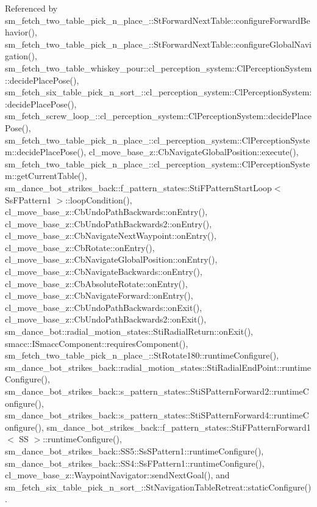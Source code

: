 Referenced by sm\+\_\+fetch\+\_\+two\+\_\+table\+\_\+pick\+\_\+n\+\_\+place\+\_\+::\+St\+Forward\+Next\+Table\+::configure\+Forward\+Behavior(), sm\+\_\+fetch\+\_\+two\+\_\+table\+\_\+pick\+\_\+n\+\_\+place\+\_\+::\+St\+Forward\+Next\+Table\+::configure\+Global\+Navigation(), sm\+\_\+fetch\+\_\+two\+\_\+table\+\_\+whiskey\+\_\+pour\+::cl\+\_\+perception\+\_\+system\+::\+Cl\+Perception\+System\+::decide\+Place\+Pose(), sm\+\_\+fetch\+\_\+six\+\_\+table\+\_\+pick\+\_\+n\+\_\+sort\+\_\+::cl\+\_\+perception\+\_\+system\+::\+Cl\+Perception\+System\+::decide\+Place\+Pose(), sm\+\_\+fetch\+\_\+screw\+\_\+loop\+\_\+::cl\+\_\+perception\+\_\+system\+::\+Cl\+Perception\+System\+::decide\+Place\+Pose(), sm\+\_\+fetch\+\_\+two\+\_\+table\+\_\+pick\+\_\+n\+\_\+place\+\_\+::cl\+\_\+perception\+\_\+system\+::\+Cl\+Perception\+System\+::decide\+Place\+Pose(), cl\+\_\+move\+\_\+base\+\_\+z\+::\+Cb\+Navigate\+Global\+Position\+::execute(), sm\+\_\+fetch\+\_\+two\+\_\+table\+\_\+pick\+\_\+n\+\_\+place\+\_\+::cl\+\_\+perception\+\_\+system\+::\+Cl\+Perception\+System\+::get\+Current\+Table(), sm\+\_\+dance\+\_\+bot\+\_\+strikes\+\_\+back\+::f\+\_\+pattern\+\_\+states\+::\+Sti\+F\+Pattern\+Start\+Loop$<$ Ss\+F\+Pattern1 $>$\+::loop\+Condition(), cl\+\_\+move\+\_\+base\+\_\+z\+::\+Cb\+Undo\+Path\+Backwards\+::on\+Entry(), cl\+\_\+move\+\_\+base\+\_\+z\+::\+Cb\+Undo\+Path\+Backwards2\+::on\+Entry(), cl\+\_\+move\+\_\+base\+\_\+z\+::\+Cb\+Navigate\+Next\+Waypoint\+::on\+Entry(), cl\+\_\+move\+\_\+base\+\_\+z\+::\+Cb\+Rotate\+::on\+Entry(), cl\+\_\+move\+\_\+base\+\_\+z\+::\+Cb\+Navigate\+Global\+Position\+::on\+Entry(), cl\+\_\+move\+\_\+base\+\_\+z\+::\+Cb\+Navigate\+Backwards\+::on\+Entry(), cl\+\_\+move\+\_\+base\+\_\+z\+::\+Cb\+Absolute\+Rotate\+::on\+Entry(), cl\+\_\+move\+\_\+base\+\_\+z\+::\+Cb\+Navigate\+Forward\+::on\+Entry(), cl\+\_\+move\+\_\+base\+\_\+z\+::\+Cb\+Undo\+Path\+Backwards\+::on\+Exit(), cl\+\_\+move\+\_\+base\+\_\+z\+::\+Cb\+Undo\+Path\+Backwards2\+::on\+Exit(), sm\+\_\+dance\+\_\+bot\+::radial\+\_\+motion\+\_\+states\+::\+Sti\+Radial\+Return\+::on\+Exit(), smacc\+::\+I\+Smacc\+Component\+::requires\+Component(), sm\+\_\+fetch\+\_\+two\+\_\+table\+\_\+pick\+\_\+n\+\_\+place\+\_\+::\+St\+Rotate180\+::runtime\+Configure(), sm\+\_\+dance\+\_\+bot\+\_\+strikes\+\_\+back\+::radial\+\_\+motion\+\_\+states\+::\+Sti\+Radial\+End\+Point\+::runtime\+Configure(), sm\+\_\+dance\+\_\+bot\+\_\+strikes\+\_\+back\+::s\+\_\+pattern\+\_\+states\+::\+Sti\+S\+Pattern\+Forward2\+::runtime\+Configure(), sm\+\_\+dance\+\_\+bot\+\_\+strikes\+\_\+back\+::s\+\_\+pattern\+\_\+states\+::\+Sti\+S\+Pattern\+Forward4\+::runtime\+Configure(), sm\+\_\+dance\+\_\+bot\+\_\+strikes\+\_\+back\+::f\+\_\+pattern\+\_\+states\+::\+Sti\+F\+Pattern\+Forward1$<$ S\+S $>$\+::runtime\+Configure(), sm\+\_\+dance\+\_\+bot\+\_\+strikes\+\_\+back\+::\+S\+S5\+::\+Ss\+S\+Pattern1\+::runtime\+Configure(), sm\+\_\+dance\+\_\+bot\+\_\+strikes\+\_\+back\+::\+S\+S4\+::\+Ss\+F\+Pattern1\+::runtime\+Configure(), cl\+\_\+move\+\_\+base\+\_\+z\+::\+Waypoint\+Navigator\+::send\+Next\+Goal(), and sm\+\_\+fetch\+\_\+six\+\_\+table\+\_\+pick\+\_\+n\+\_\+sort\+\_\+::\+St\+Navigation\+Table\+Retreat\+::static\+Configure().


